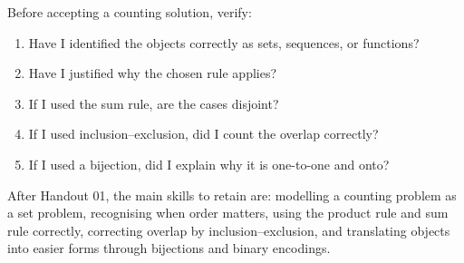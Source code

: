 \begin{commonmistake}[title={Final checklist for Handout 01}]
Before accepting a counting solution, verify:
\begin{enumerate}[leftmargin=*]
    \item Have I identified the objects correctly as sets, sequences, or functions?
    \item Have I justified why the chosen rule applies?
    \item If I used the sum rule, are the cases disjoint?
    \item If I used inclusion--exclusion, did I count the overlap correctly?
    \item If I used a bijection, did I explain why it is one-to-one and onto?
\end{enumerate}
\end{commonmistake}

\begin{examtip}[title={What should remain after this handout}]
After Handout 01, the main skills to retain are: modelling a counting problem as a set problem, recognising when order matters, using the product rule and sum rule correctly, correcting overlap by inclusion--exclusion, and translating objects into easier forms through bijections and binary encodings.
\end{examtip}